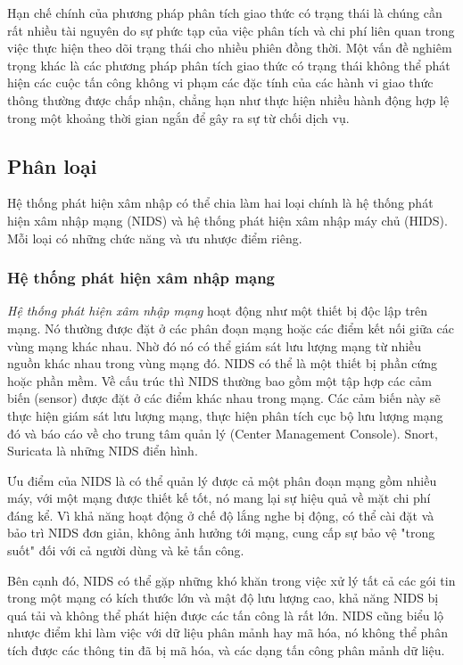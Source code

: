 Hạn chế chính của phương pháp phân tích giao thức có trạng thái là chúng cần rất nhiều tài nguyên do sự phức tạp của việc phân tích và chi phí liên quan trong việc thực hiện theo dõi trạng thái cho nhiều phiên đồng thời. Một vấn đề nghiêm trọng khác là các phương pháp phân tích giao thức có trạng thái không thể phát hiện các cuộc tấn công không vi phạm các đặc tính của các hành vi giao thức thông thường được chấp nhận, chẳng hạn như thực hiện nhiều hành động hợp lệ trong một khoảng thời gian ngắn để gây ra sự từ chối dịch vụ.

\subsection{Phân loại}
Hệ thống phát hiện xâm nhập có thể chia làm hai loại chính là hệ thống phát hiện xâm nhập mạng (NIDS) và hệ thống phát hiện xâm nhập máy chủ (HIDS). Mỗi loại có những chức năng và ưu nhược điểm riêng.

\subsubsection{Hệ thống phát hiện xâm nhập mạng}
\emph{Hệ thống phát hiện xâm nhập mạng} hoạt động như một thiết bị độc lập trên mạng. Nó thường được đặt ở các phân đoạn mạng hoặc các điểm kết nối giữa các vùng mạng khác nhau. Nhờ đó nó có thể giám sát lưu lượng mạng từ nhiều nguồn khác nhau trong vùng mạng đó. NIDS có thể là một thiết bị phần cứng hoặc phần mềm. Về cấu trúc thì NIDS thường bao gồm một tập hợp các cảm biến (sensor) được đặt ở các điểm khác nhau trong mạng. Các cảm biến này sẽ thực hiện giám sát lưu lượng mạng, thực hiện phân tích cục bộ lưu lượng mạng đó và báo cáo về cho trung tâm quản lý (Center Management Console). Snort, Suricata là những NIDS điển hình.

Ưu điểm của NIDS là có thể quản lý được cả một phân đoạn mạng gồm nhiều máy, với một mạng được thiết kế tốt, nó mang lại sự hiệu quả về mặt chi phí đáng kể. Vì khả năng hoạt động ở chế độ lắng nghe bị động, có thể cài đặt và bảo trì NIDS đơn giản, không ảnh hưởng tới mạng, cung cấp sự bảo vệ "trong suốt" đối với cả người dùng và kẻ tấn công.

Bên cạnh đó, NIDS có thể gặp những khó khăn trong việc xử lý tất cả các gói tin trong một mạng có kích thước lớn và mật độ lưu lượng cao, khả năng NIDS bị quá tải và không thể phát hiện được các tấn công là rất lớn. NIDS cũng biểu lộ nhược điểm khi làm việc với dữ liệu phân mảnh hay mã hóa, nó không thể phân tích được các thông tin đã bị mã hóa, và các dạng tấn công phân mảnh dữ liệu.

